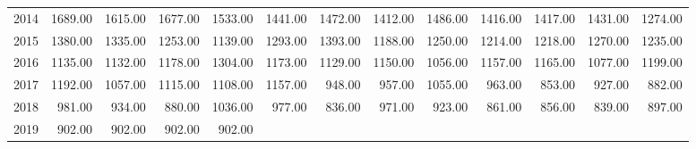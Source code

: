\begin{longtable}{rrrrrrrrrrrrr}
  2014 & 1689.00 & 1615.00 & 1677.00 & 1533.00 & 1441.00 & 1472.00 & 1412.00 & 1486.00 & 1416.00 & 1417.00 & 1431.00 & 1274.00 \\ 
  2015 & 1380.00 & 1335.00 & 1253.00 & 1139.00 & 1293.00 & 1393.00 & 1188.00 & 1250.00 & 1214.00 & 1218.00 & 1270.00 & 1235.00 \\ 
  2016 & 1135.00 & 1132.00 & 1178.00 & 1304.00 & 1173.00 & 1129.00 & 1150.00 & 1056.00 & 1157.00 & 1165.00 & 1077.00 & 1199.00 \\ 
  2017 & 1192.00 & 1057.00 & 1115.00 & 1108.00 & 1157.00 & 948.00 & 957.00 & 1055.00 & 963.00 & 853.00 & 927.00 & 882.00 \\ 
  2018 & 981.00 & 934.00 & 880.00 & 1036.00 & 977.00 & 836.00 & 971.00 & 923.00 & 861.00 & 856.00 & 839.00 & 897.00 \\ 
  2019 & 902.00 & 902.00 & 902.00 & 902.00 &  &  &  &  &  &  &  &  \\ 
   \hline
\hline
\end{longtable}
